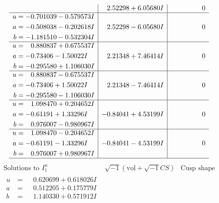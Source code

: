 \documentclass[1p]{elsarticle_modified}
\theoremstyle{definition}
\newcommand{\I}{\sqrt{-1}}
\begin{document}
$$\begin{array}{c|c|c}
 & \phantom{-}2.52298 + 6.05680 I & \phantom{-0.000000 } 0 \\ \hline\begin{aligned}
u &= -0.701039 - 0.579573 I \\
a &= -0.508038 - 0.202618 I \\
b &= -1.181510 - 0.532304 I\end{aligned}
 & \phantom{-}2.52298 - 6.05680 I & \phantom{-0.000000 } 0 \\ \hline\begin{aligned}
u &= \phantom{-}0.880837 + 0.675537 I \\
a &= -0.73406 - 1.50022 I \\
b &= -0.295580 + 1.106030 I\end{aligned}
 & \phantom{-}2.21348 + 7.46414 I & \phantom{-0.000000 } 0 \\ \hline\begin{aligned}
u &= \phantom{-}0.880837 - 0.675537 I \\
a &= -0.73406 + 1.50022 I \\
b &= -0.295580 - 1.106030 I\end{aligned}
 & \phantom{-}2.21348 - 7.46414 I & \phantom{-0.000000 } 0 \\ \hline\begin{aligned}
u &= \phantom{-}1.098470 + 0.204652 I \\
a &= -0.61191 + 1.33296 I \\
b &= \phantom{-}0.976007 - 0.980967 I\end{aligned}
 & -0.84041 + 4.53199 I & \phantom{-0.000000 } 0 \\ \hline\begin{aligned}
u &= \phantom{-}1.098470 - 0.204652 I \\
a &= -0.61191 - 1.33296 I \\
b &= \phantom{-}0.976007 + 0.980967 I\end{aligned}
 & -0.84041 - 4.53199 I & \phantom{-0.000000 } 0\\
 \hline 
 \end{array}$$\newpage$$\begin{array}{c|c|c}  
\text{Solutions to }I^u_{1}& \I (\text{vol} + \sqrt{-1}CS) & \text{Cusp shape}\\
 \hline 
\begin{aligned}
u &= \phantom{-}0.620699 + 0.618026 I \\
a &= \phantom{-}0.512205 + 0.175779 I \\
b &= \phantom{-}1.140330 + 0.571912 I\end{aligned}

\end{array}$$
\end{document}
